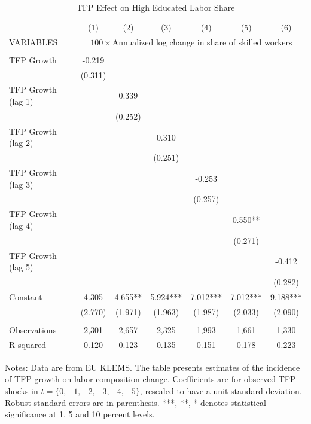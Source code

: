 \documentclass[12pt]{article}
\begin{document}
\begin{table}[h!]
\begin{center}
\scriptsize
\begin{tabular}{lcccccc} \hline \hline
 & (1) & (2) & (3) & (4) & (5) & (6)\\
VARIABLES & \multicolumn{6}{c}{$100 \times$Annualized log change in share of skilled workers} \\ \hline
 &  &  &  &  &  &  \\
TFP Growth & -0.219 &  &  &  &  &  \\
 & (0.311) &  &  &  &  &  \\
TFP Growth (lag 1) &  & 0.339 &  &  &  &  \\
 &  & (0.252) &  &  &  &  \\
TFP Growth (lag 2) &  &  & 0.310 &  &  &  \\
 &  &  & (0.251) &  &  &  \\
TFP Growth (lag 3) &  &  &  & -0.253 &  &  \\
 &  &  &  & (0.257) &  &  \\
TFP Growth (lag 4) &  &  &  &  & 0.550** &  \\
 &  &  &  &  & (0.271) &  \\
TFP Growth (lag 5) &  &  &  &  &  & -0.412 \\
 &  &  &  &  &  & (0.282) \\
Constant & 4.305 & 4.655** & 5.924*** & 7.012*** & 7.012*** & 9.188*** \\
 & (2.770) & (1.971) & (1.963) & (1.987) & (2.033) & (2.090) \\
 &  &  &  &  &  &  \\
Observations & 2,301 & 2,657 & 2,325 & 1,993 & 1,661 & 1,330 \\
 R-squared & 0.120 & 0.123 & 0.135 & 0.151 & 0.178 & 0.223 \\ \hline
\end{tabular}
\end{center}
\caption{TFP Effect on High Educated Labor Share}
\label{estimation1}
{\scriptsize Notes: Data are from EU KLEMS. The table presents estimates of the incidence of TFP growth on labor composition change. Coefficients are for observed TFP shocks in $t = \{0,-1,-2,-3,-4,-5\}$, rescaled to have a unit standard deviation. Robust standard errors are in parenthesis. ***, **, * denotes statistical significance at 1, 5 and 10 percent levels.}
\end{table}
\end{document}
